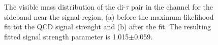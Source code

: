 \begin{figure}[h!]
\begin{center}
\end{center}
\caption{The visible mass distribution of the di-$\tau$ pair in the \etau channel for the sideband near the signal region, (a) before
the maximum likelihood fit tot the QCD signal strenght and (b) after the fit. The resulting fitted signal strength parameter
is 1.015$\pm$0.059.}
\label{fig:mssm_qcdosss_etnear}
\end{figure}

